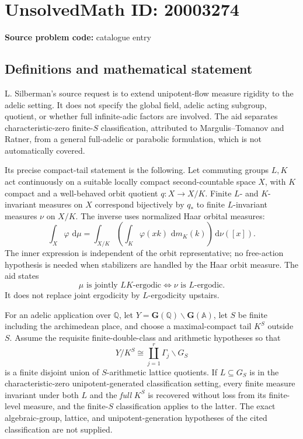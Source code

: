 \documentclass[11pt]{article}
\newcommand{\Q}{\mathbb{Q}}
\newcommand{\dd}{\,\mathrm{d}}
\begin{document}
\section*{UnsolvedMath ID: 20003274}
\textbf{Source problem code:} catalogue entry
\subsection{Definitions and mathematical statement}
L. Silberman's source request is to extend unipotent-flow measure rigidity to the adelic setting. It does not specify the global field, adelic acting subgroup, quotient, or whether full infinite-adic factors are involved. The aid separates characteristic-zero finite-\(S\) classification, attributed to Margulis--Tomanov and Ratner, from a general full-adelic or parabolic formulation, which is not automatically covered.

Its precise compact-tail statement is the following. Let commuting groups \(L,K\) act continuously on a suitable locally compact second-countable space \(X\), with \(K\) compact and a well-behaved orbit quotient \(q:X\to X/K\). Finite \(L\)- and \(K\)-invariant measures on \(X\) correspond bijectively by \(q_*\) to finite \(L\)-invariant measures \(\nu\) on \(X/K\). The inverse uses normalized Haar orbital measures:
\[
 \int_X\varphi\,\dd\mu
 =\int_{X/K}\left(\int_K\varphi(xk)\,\dd m_K(k)\right)\dd\nu([x]).
\]
The inner expression is independent of the orbit representative; no free-action hypothesis is needed when stabilizers are handled by the Haar orbit measure. The aid states
\[
 \mu\text{ is jointly }LK\text{-ergodic}
 \Longleftrightarrow\nu\text{ is }L\text{-ergodic}.
\]
It does not replace joint ergodicity by \(L\)-ergodicity upstairs.

For an adelic application over \(\Q\), let \(Y=\mathbf G(\Q)\backslash\mathbf G(\mathbb A)\), let \(S\) be finite including the archimedean place, and choose a maximal-compact tail \(K^S\) outside \(S\). Assume the requisite finite-double-class and arithmetic hypotheses so that
\[
 Y/K^S\cong\coprod_{j=1}^{r}\Gamma_j\backslash G_S
\]
is a finite disjoint union of \(S\)-arithmetic lattice quotients. If \(L\subseteq G_S\) is in the characteristic-zero unipotent-generated classification setting, every finite measure invariant under both \(L\) and the \emph{full} \(K^S\) is recovered without loss from its finite-level measure, and the finite-\(S\) classification applies to the latter. The exact algebraic-group, lattice, and unipotent-generation hypotheses of the cited classification are not supplied.
\end{document}
